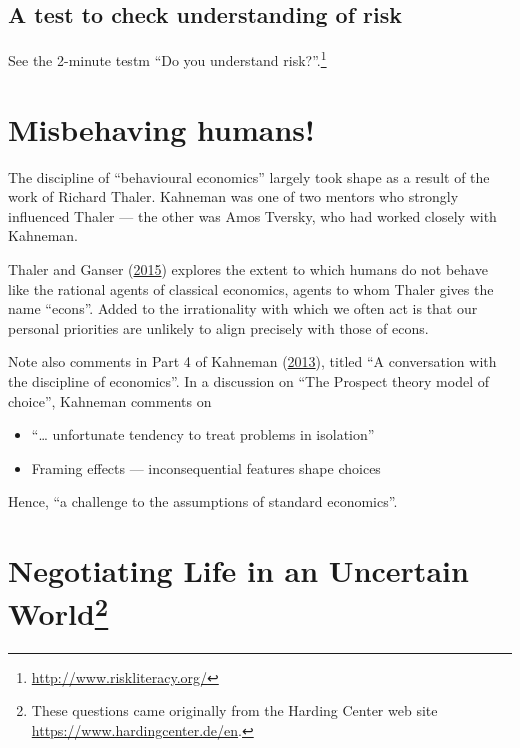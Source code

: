 \documentclass[
  10pt,
  b5paper]{book}
\providecommand{\tightlist}{%
  \setlength{\itemsep}{0pt}\setlength{\parskip}{0pt}}
\begin{document}
\hypertarget{a-test-to-check-understanding-of-risk}{%
\subsection*{A test to check understanding of risk}\label{a-test-to-check-understanding-of-risk}}

See the 2-minute testm ``Do you understand risk?''.\footnote{\url{http://www.riskliteracy.org/}}

\hypertarget{misbehaving-humans}{%
\section{Misbehaving humans!}\label{misbehaving-humans}}

The discipline of ``behavioural economics'' largely took shape as a result of the work of Richard Thaler. Kahneman was one of two mentors who strongly influenced Thaler --- the other was Amos Tversky, who had worked closely with Kahneman.

Thaler and Ganser (\protect\hyperlink{ref-thaler2015misbehaving}{2015}) explores the extent to which humans do not behave like the rational agents of classical economics, agents to whom Thaler gives the name ``econs''. Added to the irrationality with which we often act is that our personal priorities are unlikely to align precisely with those of econs.

Note also comments in Part 4 of Kahneman (\protect\hyperlink{ref-kahneman_2013}{2013}), titled ``A conversation with the discipline of economics''. In a discussion on ``The Prospect theory model of choice'', Kahneman comments on

\begin{itemize}
\tightlist
\item
  ``\ldots{} unfortunate tendency to treat problems in isolation''
\item
  Framing effects --- inconsequential features shape choices
\end{itemize}

Hence, ``a challenge to the assumptions of standard economics''.

\hypertarget{negotiating-life-in-an-uncertain-world01-judgment-5}{%
\section[Negotiating Life in an Uncertain World]{\texorpdfstring{Negotiating Life in an Uncertain World\footnote{These questions came originally from the Harding Center web site \url{https://www.hardingcenter.de/en}.}}{Negotiating Life in an Uncertain World}}\label{negotiating-life-in-an-uncertain-world01-judgment-5}}
\end{document}
